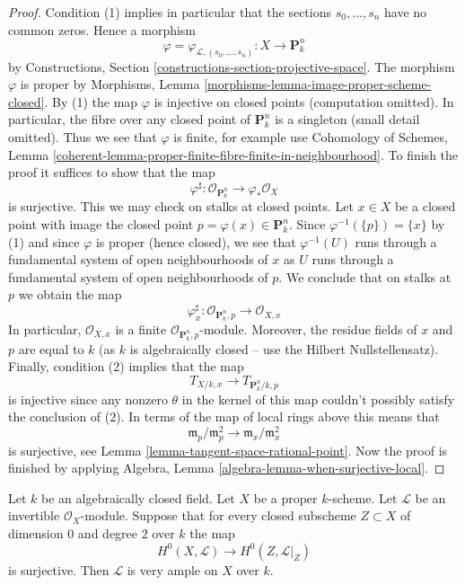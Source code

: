 \begin{proof}
Condition (1) implies in particular that the sections $s_0, \ldots, s_n$
have no common zeros. Hence a morphism
$$
\varphi = \varphi_{\mathcal{L}, (s_0, \ldots, s_n)} :
X
\longrightarrow
\mathbf{P}^n_k
$$
by Constructions, Section \ref{constructions-section-projective-space}.
The morphism $\varphi$ is proper by
Morphisms, Lemma \ref{morphisms-lemma-image-proper-scheme-closed}.
By (1) the map $\varphi$ is injective on closed points
(computation omitted).
In particular, the fibre over any closed point of $\mathbf{P}^n_k$
is a singleton (small detail omitted). Thus we see that
$\varphi$ is finite, for example use Cohomology of Schemes, Lemma
\ref{coherent-lemma-proper-finite-fibre-finite-in-neighbourhood}.
To finish the proof it suffices to show that the map
$$
\varphi^\sharp :
\mathcal{O}_{\mathbf{P}^n_k}
\longrightarrow
\varphi_*\mathcal{O}_X
$$
is surjective. This we may check on stalks at closed points.
Let $x \in X$ be a closed point with image the closed
point $p = \varphi(x) \in \mathbf{P}^n_k$. Since
$\varphi^{-1}(\{p\}) = \{x\}$ by (1) and since $\varphi$
is proper (hence closed), we see that $\varphi^{-1}(U)$
runs through a fundamental system of open neighbourhoods
of $x$ as $U$ runs through a fundamental system of open neighbourhoods of $p$.
We conclude that on stalks at $p$ we obtain the map
$$
\varphi^\sharp_x :
\mathcal{O}_{\mathbf{P}^n_k, p}
\longrightarrow
\mathcal{O}_{X, x}
$$
In particular, $\mathcal{O}_{X, x}$ is a finite
$\mathcal{O}_{\mathbf{P}^n_k, p}$-module.
Moreover, the residue fields of $x$ and $p$ are equal to $k$
(as $k$ is algebraically closed -- use the Hilbert Nullstellensatz).
Finally, condition (2) implies that the map
$$
T_{X/k, x} \longrightarrow T_{\mathbf{P}^n_k/k, p}
$$
is injective since any nonzero $\theta$ in the kernel of this map
couldn't possibly satisfy the conclusion of (2).
In terms of the map of local rings above this means that
$$
\mathfrak m_p/\mathfrak m_p^2 \longrightarrow
\mathfrak m_x/\mathfrak m_x^2
$$
is surjective, see Lemma \ref{lemma-tangent-space-rational-point}.
Now the proof is finished by applying
Algebra, Lemma \ref{algebra-lemma-when-surjective-local}.
\end{proof}

\begin{lemma}
\label{lemma-variant-separate-points-tangent-vectors}
Let $k$ be an algebraically closed field.
Let $X$ be a proper $k$-scheme.
Let $\mathcal{L}$ be an invertible $\mathcal{O}_X$-module.
Suppose that for every closed subscheme $Z \subset X$
of dimension $0$ and degree $2$ over $k$ the map
$$
H^0(X, \mathcal{L}) \longrightarrow H^0(Z, \mathcal{L}|_Z)
$$
is surjective. Then $\mathcal{L}$ is very ample on $X$ over $k$.
\end{lemma}

